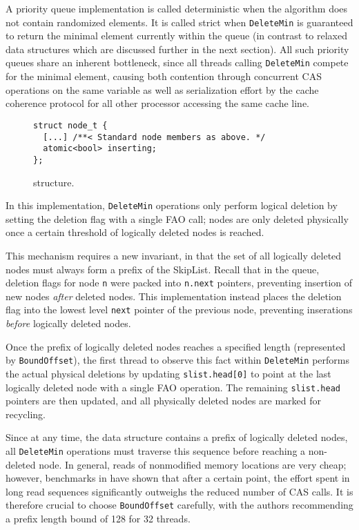 \documentclass[a4paper,10pt]{article}
\begin{document}
A priority queue implementation is called deterministic when the algorithm does not contain randomized elements.
It is called strict when \lstinline|DeleteMin| is guaranteed to return the minimal element currently within the queue
(in contrast to relaxed data structures which are discussed further in the next section).
All such priority queues share an inherent bottleneck, since all threads calling \lstinline|DeleteMin| compete
for the minimal element, causing both contention through concurrent \ac{CAS} operations on the same variable
as well as serialization effort by the cache coherence protocol for all other processor accessing the same cache
line.

\begin{figure}[ht]
\begin{lstlisting}
struct node_t {
  [...] /**< Standard node members as above. */
  atomic<bool> inserting;
};
\end{lstlisting}
\caption{\citeauthor{linden2013skiplist} structure.}
\label{fig:lindensl}
\end{figure}


In this implementation, \lstinline|DeleteMin| operations only perform logical deletion by setting
the deletion flag with a single \ac{FAO} call; nodes are only deleted physically once a certain
threshold of logically deleted nodes is reached.

This mechanism requires a new invariant, in that the set of all logically deleted nodes must always
form a prefix of the SkipList. Recall that in the \citeauthor{sundell2003fast} queue, deletion flags
for node \lstinline|n| were packed into \lstinline|n.next| pointers, preventing insertion of new
nodes \emph{after} deleted nodes. This implementation instead places the deletion flag into the
lowest level \lstinline|next| pointer of the previous node, preventing inserations \emph{before}
logically deleted nodes.

Once the prefix of logically deleted nodes reaches a specified length (represented by \lstinline|BoundOffset|),
the first thread to observe this fact within \lstinline|DeleteMin| performs the actual physical
deletions by updating \lstinline|slist.head[0]| to point at the last logically deleted node with a
single \ac{FAO} operation. The remaining \lstinline|slist.head| pointers are then updated, and
all physically deleted nodes are marked for recycling.

Since at any time, the data structure contains a prefix of logically deleted nodes, all \lstinline|DeleteMin|
operations must traverse this sequence before reaching a non-deleted node. In general, reads of nonmodified
memory locations are very cheap; however, benchmarks in \cite{linden2013skiplist} have shown that
after a certain point, the effort spent in long read sequences significantly outweighs the reduced
number of \ac{CAS} calls. It is therefore crucial to choose \lstinline|BoundOffset| carefully, with the
authors recommending a prefix length bound of 128 for 32 threads.
\end{document}

